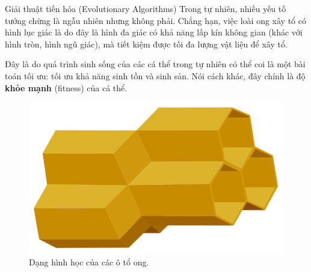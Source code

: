 \begin{frame}{Giải thuật tiến hóa (Evolutionary Algorithms)}
Trong tự nhiên, nhiều yếu tố tưởng chừng là ngẫu nhiên nhưng không phải. Chẳng
hạn, việc loài ong xây tổ có hình lục giác là do đây là hình đa giác có khả năng
lấp kín không gian (khác với hình tròn, hình ngũ giác), mà tiết kiệm được tối đa
lượng vật liệu để xây tổ.

Đây là do quá trình sinh sống của các cá thể trong tự nhiên có thể coi là một
bài toán tối ưu: tối ưu khả năng sinh tồn và sinh sản. Nói cách khác, đây chính
là độ \textbf{khỏe mạnh} (fitness) của cá thể.

\begin{figure}
\centering 
\includegraphics[width=\textwidth, height=0.2\textheight, keepaspectratio]
{res/honeycomb.png}
\caption{Dạng hình học của các ô tổ ong.}
\end{figure}
\end{frame}

